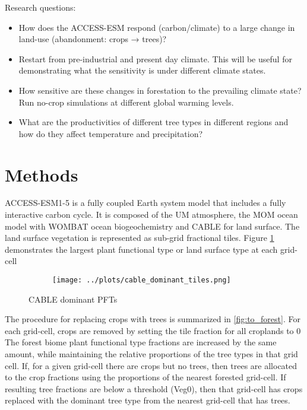 \documentclass[]{article}
\begin{document}
Research questions:
\begin{itemize}
\item How does the ACCESS-ESM respond (carbon/climate) to a large change in land-use (abandonment: crops → trees)?
\item Restart from pre-industrial and present day climate. This will be useful for demonstrating what the sensitivity is under different climate states.
\item How sensitive are these changes in forestation to the prevailing climate state? Run no-crop simulations at different global warming levels.
\item What are the productivities of different tree types in different regions and how do they affect temperature and precipitation?
\end{itemize}

\section{Methods}

ACCESS-ESM1-5 is a fully coupled Earth system model that includes a fully interactive carbon cycle.
It is composed of the UM atmosphere, the MOM ocean model with WOMBAT ocean biogeochemistry and CABLE for land surface.
The land surface vegetation is represented as sub-grid fractional tiles.
Figure \ref{fig:dominant_pfts} demonstrates the largest plant functional type or land surface type at each grid-cell

\begin{figure}[H]
    \begin{subfigure}[b]{\linewidth}
        \centering
        \texttt{[image: ../plots/cable\_dominant\_tiles.png]}
    \end{subfigure}
    \caption{CABLE dominant PFTs}
    \label{fig:dominant_pfts}
\end{figure}

The procedure for replacing crops with trees is summarized in \ref{fig:to_forest}.
For each grid-cell, crops are removed by setting the tile fraction for all croplands to 0
The forest biome plant functional type fractions are increased by the same amount, while maintaining the relative proportions of the tree types in that grid cell.
If, for a given grid-cell there are crops but no trees, then trees are allocated to the crop fractions using the proportions of the nearest forested grid-cell.
If resulting tree fractions are below a threshold (Veg0), then that grid-cell has crops replaced with the dominant tree type from the nearest grid-cell that has trees.
\end{document}
